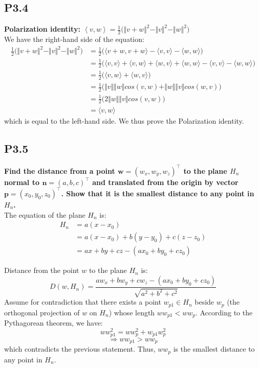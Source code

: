 \documentclass[12pt]{article}
\begin{document}
\subsection*{P3.4}
\textbf{Polarization identity:  $\left \langle v,w \right \rangle = \frac1{2}\big(\Vert v+w\Vert^2 -\Vert v\Vert^2 - \Vert w\Vert^2 \big)$}\\
We have the right-hand side of the equation:
\begin{align*}
\frac1{2}\big(\Vert v+w\Vert^2 -\Vert v\Vert^2 - \Vert w\Vert^2 \big) &= \frac1{2}\big(\langle v+w,v+w \rangle - \langle v,v \rangle - \langle w,w \rangle \big)\\
& = \frac1{2}\big(\langle v, v \rangle + \langle v, w \rangle + \langle w, v \rangle + \langle w,w \rangle - \langle v,v \rangle - \langle w,w \rangle \big)\\
& = \frac1{2}\big(\langle v,w \rangle + \langle w,v \rangle \big)\\
& = \frac1{2}\big(\Vert v\Vert\Vert w \Vert cos(v,w) + \Vert w \Vert \Vert v\Vert cos(w,v)\big)\\
& = \frac1{2}\big(2\Vert w \Vert \Vert v \Vert cos(v,w)\big)\\
& = \langle v,w \rangle
\end{align*}
which is equal to the left-hand side. We thus prove the Polarization identity.





\subsection*{P3.5}
\textbf{Find the distance from a point $\mathbf w=(w_x,w_y,w_z)^\top$ to the plane $H_n$ normal to $\mathbf n=(a,b,c)^\top$ and translated from the origin by vector $\mathbf p=(x_0,y_0,z_0)^\top$. Show that it is the smallest distance to any point in $H_n$.}\\
The equation of the plane $H_n$ is:
\begin{align*}
H_n &= a(x-x_0)\\
	&= a(x-x_0)+b(y-y_0)+c(z-z_0)\\
	&= ax + by + cz -(ax_0+by_0+cz_0)
\end{align*}

Distance from the point $w$ to the plane $H_n$ is:
$$D(w, H_n) = \frac{aw_x + b w_y + c w_z -(ax_0+by_0+cz_0)}{\sqrt{a^2+b^2+c^2}}$$
Assume for contradiction that there exists a point $w_{p1} \in H_n $ beside $w_p$ (the orthogonal projection of $w$ on $H_n$) whose length $ ww_{p1} < ww_p$. According to the Pythagorean theorem, we have:
$$ww_{p1}^2 = ww_p^2 + w_{p1}w_p^2$$
$$\Rightarrow ww_{p1} > ww_p$$
which contradicts the previous statement. Thus, $ww_p$ is the smallest distance to any point in $H_n$.
\end{document}
